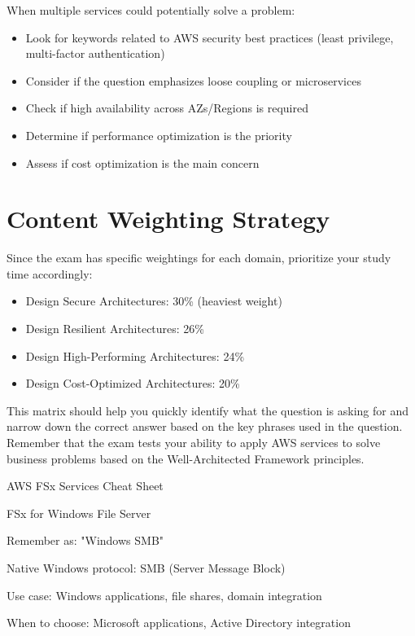 \documentclass[11pt,a4paper]{report}
\begin{document}
When multiple services could potentially solve a problem:


\begin{itemize}
  \item Look for keywords related to AWS security best practices (least privilege, multi-factor authentication)
  \item Consider if the question emphasizes loose coupling or microservices
  \item Check if high availability across AZs/Regions is required
  \item Determine if performance optimization is the priority
  \item Assess if cost optimization is the main concern
\end{itemize}


\chapter{Content Weighting Strategy}


Since the exam has specific weightings for each domain, prioritize your study time accordingly:

\begin{itemize}
  \item Design Secure Architectures: 30\% (heaviest weight)
  \item Design Resilient Architectures: 26\%
  \item Design High-Performing Architectures: 24\%
  \item Design Cost-Optimized Architectures: 20\%
\end{itemize}

This matrix should help you quickly identify what the question is asking for and narrow down the correct answer based on the key phrases used in the question. Remember that the exam tests your ability to apply AWS services to solve business problems based on the Well-Architected Framework principles.



AWS FSx Services Cheat Sheet

FSx for Windows File Server

Remember as: "Windows SMB"


Native Windows protocol: SMB (Server Message Block)

Use case: Windows applications, file shares, domain integration

When to choose: Microsoft applications, Active Directory integration
\end{document}
